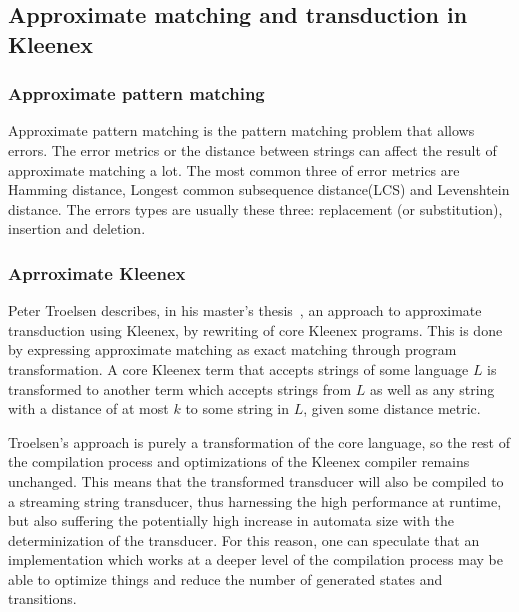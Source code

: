 \subsection{Approximate matching and transduction in Kleenex}
\subsubsection{Approximate pattern matching}
Approximate pattern matching is the pattern matching problem that allows errors. The error metrics or the distance between strings can affect the result of approximate matching a lot. The most common three of error metrics are Hamming distance, Longest common subsequence distance(LCS) and Levenshtein distance. The errors types are usually these three: replacement (or substitution), insertion and deletion.


\subsubsection{Aprroximate Kleenex} \label{sec:approx-kleenex}
Peter Troelsen describes, in his master's
thesis~\cite{troelsen2016approximate}, an approach to approximate transduction
using Kleenex, by rewriting of core Kleenex programs. This is done by
expressing approximate matching as exact matching through program
transformation. A core Kleenex term that accepts strings of some language $L$
is transformed to another term which accepts strings from $L$ as well as any
string with a distance of at most $k$ to some string in $L$, given some
distance metric.

Troelsen's approach is purely a transformation of the core language, so the
rest of the compilation process and optimizations of the Kleenex compiler
remains unchanged. This means that the transformed transducer will also be
compiled to a streaming string transducer, thus harnessing the high performance
at runtime, but also suffering the potentially high increase in automata size
with the determinization of the transducer. For this reason, one can speculate
that an implementation which works at a deeper level of the compilation process
may be able to optimize things and reduce the number of generated states and
transitions.


